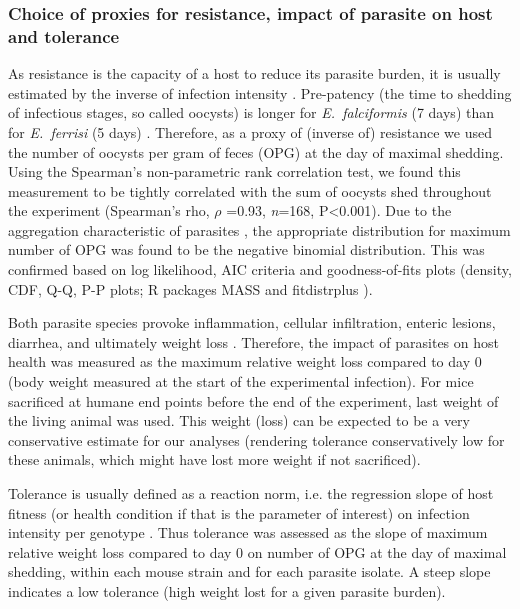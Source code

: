 \subsubsection{Choice of proxies for resistance, impact of parasite on host and tolerance}
As resistance is the capacity of a host to reduce its parasite burden, it is usually estimated by the inverse of infection intensity \citep{raaberg_decomposing_2009}. Pre-patency (the time to shedding of infectious stages, so called oocysts) is longer for \textit{E.~falciformis} (7 days) than for \textit{E.~ferrisi} (5 days) \citep{al-khlifeh_eimeria_2019}. Therefore, as a proxy of (inverse of) resistance we used the number of oocysts per gram of feces (OPG) at the day of maximal shedding. Using the Spearman's non-parametric rank correlation test, we found this measurement to be tightly correlated with the sum of oocysts shed throughout the experiment (Spearman's rho, $ \rho $ =0.93, \textit{n}=168, P<0.001). Due to the aggregation characteristic of parasites \citep{shaw_patterns_1995}, the appropriate distribution for maximum number of OPG was found to be the negative binomial distribution. This was confirmed based on log likelihood, AIC criteria and goodness-of-fits plots (density, CDF, Q-Q, P-P plots; R packages MASS \citep{venables_modern_2002} and fitdistrplus \citep{delignette-muller_fitdistrplus_2015}). \par

Both parasite species provoke inflammation, cellular infiltration, enteric lesions, diarrhea, and ultimately weight loss \citep{ankrom_life_1975, ehret_dual_2017, schito_comparison_1996, al-khlifeh_eimeria_2019}. Therefore, the impact of parasites on host health was measured as the maximum relative weight loss compared to day 0 (body weight measured at the start of the experimental infection). For mice sacrificed at humane end points before the end of the experiment, last weight of the living animal was used. This weight (loss) can be expected to be a very conservative estimate for our analyses (rendering tolerance conservatively low for these animals, which might have lost more weight if not sacrificed). \par

Tolerance is usually defined as a reaction norm, i.e. the regression slope of host fitness (or health condition if that is the parameter of interest) on infection intensity per genotype \citep{Simms2000, raaberg_decomposing_2009}. Thus tolerance was assessed as the slope of maximum relative weight loss compared to day 0 on number of OPG at the day of maximal shedding, within each mouse strain and for each parasite isolate. A steep slope indicates a low tolerance (high weight lost for a given parasite burden).

